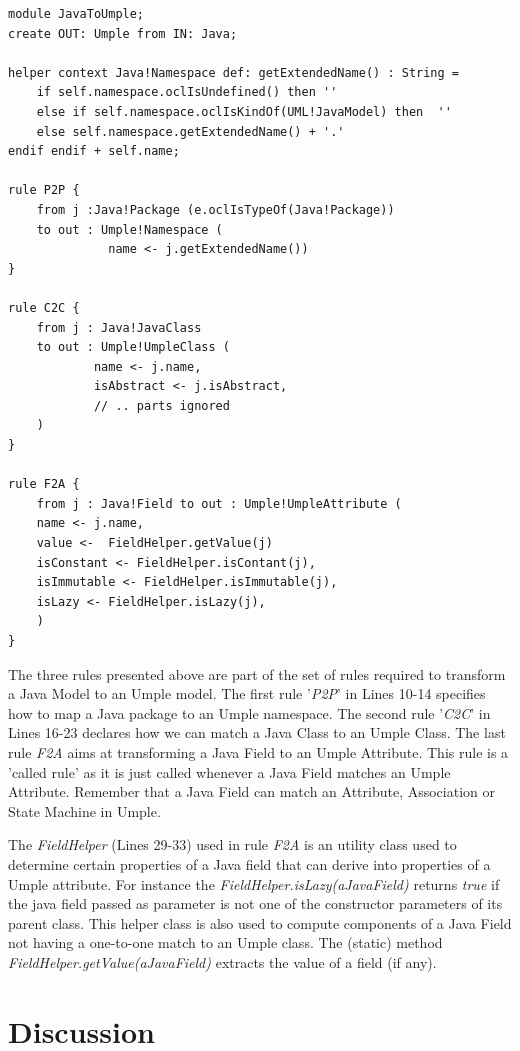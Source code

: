 \begin{lstlisting}[style=atl, label=lst:atlrules, caption=ATL Transformations rules]
module JavaToUmple;
create OUT: Umple from IN: Java;

helper context Java!Namespace def: getExtendedName() : String = 
	if self.namespace.oclIsUndefined() then '' 	
	else if self.namespace.oclIsKindOf(UML!JavaModel) then 	'' 
	else self.namespace.getExtendedName() + '.'
endif endif + self.name;

rule P2P { 
	from j :Java!Package (e.oclIsTypeOf(Java!Package)) 	
	to out : Umple!Namespace ( 		
			  name <- j.getExtendedName())
}

rule C2C { 	
	from j : Java!JavaClass 	
	to out : Umple!UmpleClass ( 	
			name <- j.name, 	
			isAbstract <- j.isAbstract,      
			// .. parts ignored		
	)
}

rule F2A { 	
	from j : Java!Field to out : Umple!UmpleAttribute ( 		
	name <- j.name,
	value <-  FieldHelper.getValue(j) 	
	isConstant <- FieldHelper.isContant(j), 		
	isImmutable <- FieldHelper.isImmutable(j), 		
	isLazy <- FieldHelper.isLazy(j),
	)
}

\end{lstlisting}

The three rules presented above are part of the set of rules required to transform a Java Model to an Umple model.  The first rule '\textit{P2P}' in Lines 10-14  specifies how to map a Java package to an Umple namespace. The second rule '\textit{C2C}' in Lines 16-23 declares how we can match a Java Class to an Umple Class. The last rule \textit{F2A} aims at transforming a Java Field to an Umple Attribute. This rule is a 'called rule' as it is just called whenever a Java Field matches an Umple Attribute. Remember that a Java Field can match an Attribute, Association or State Machine in Umple.

The \textit{FieldHelper} (Lines 29-33) used in rule \textit{F2A} is an utility class used to determine certain properties of a Java field that can derive into properties of a Umple attribute. For instance the \textit{FieldHelper.isLazy(aJavaField)} returns \textit{true} if the java field passed as parameter is not one of the constructor parameters of its parent class. This helper class is also used to compute components of a Java Field not having a one-to-one match to an Umple class. The (static) method \textit{FieldHelper.getValue(aJavaField)} extracts the value of a field (if any). 

\section{Discussion}

